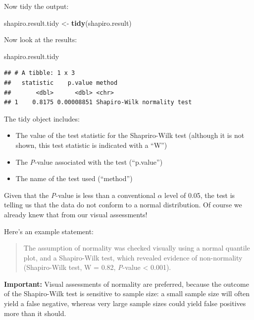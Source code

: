 \documentclass[
]{book}
\newenvironment{Shaded}{\begin{snugshade}}{\end{snugshade}}
\newcommand{\FunctionTok}[1]{\textcolor[rgb]{0.13,0.29,0.53}{\textbf{#1}}}
\newcommand{\NormalTok}[1]{#1}
\newcommand{\OtherTok}[1]{\textcolor[rgb]{0.56,0.35,0.01}{#1}}
\providecommand{\tightlist}{%
  \setlength{\itemsep}{0pt}\setlength{\parskip}{0pt}}
\begin{document}
Now tidy the output:

\begin{Shaded}
\begin{Highlighting}[]
\NormalTok{shapiro.result.tidy }\OtherTok{\textless{}{-}} \FunctionTok{tidy}\NormalTok{(shapiro.result)}
\end{Highlighting}
\end{Shaded}

Now look at the results:

\begin{Shaded}
\begin{Highlighting}[]
\NormalTok{shapiro.result.tidy}
\end{Highlighting}
\end{Shaded}

\begin{verbatim}
## # A tibble: 1 x 3
##   statistic    p.value method                     
##       <dbl>      <dbl> <chr>                      
## 1    0.8175 0.00008851 Shapiro-Wilk normality test
\end{verbatim}

The tidy object includes:

\begin{itemize}
\tightlist
\item
  The value of the test statistic for the Shapriro-Wilk test (although it is not shown, this test statistic is indicated with a ``W'')
\item
  The \emph{P}-value associated with the test (``p.value'')
\item
  The name of the test used (``method'')
\end{itemize}

Given that the \emph{P}-value is less than a conventional \(\alpha\) level of 0.05, the test is telling us that the data do not conform to a normal distribution. Of course we already knew that from our visual assessments!

Here's an example statement:

\begin{quote}
The assumption of normality was checked visually using a normal quantile plot, and a Shapiro-Wilk test, which revealed evidence of non-normality (Shapiro-Wilk test, W = 0.82, \emph{P}-value \textless{} 0.001).
\end{quote}

\textbf{Important: }
Visual assessments of normality are preferred, because the outcome of the Shapiro-Wilk test is sensitive to sample size: a small sample size will often yield a false negative, whereas very large sample sizes could yield false positives more than it should.
\end{document}
